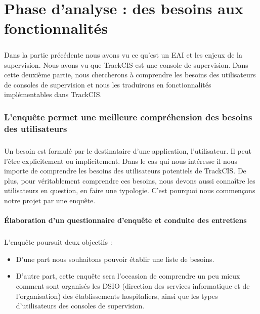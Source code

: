 \chapter{Phase d'analyse : des besoins aux fonctionnalités}
	\paragraph{}
	Dans la partie précédente nous avons vu ce qu'est un EAI et les enjeux de la
	supervision. Nous avons vu que TrackCIS est une console de supervision. Dans
	cette deuxième partie, nous chercherons à comprendre les besoins des
	utilisateurs de consoles de supervision et nous les traduirons en
	fonctionnalités implémentables dans TrackCIS.
	
	\subsection{L'enquête permet une meilleure compréhension des besoins des utilisateurs}
		\paragraph{}
		Un besoin est formulé par le destinataire d'une application, l'utilisateur. Il
		peut l'être explicitement ou implicitement. Dans le cas qui nous intéresse il
		nous importe de comprendre les besoins des utilisateurs potentiels de
		TrackCIS. De plus, pour véritablement comprendre ces besoins, nous devons
		aussi connaître les utilisateurs en question, en faire une typologie. C'est
		pourquoi nous commençons notre projet par une enquête.
		
		\subsubsection{Élaboration d'un questionnaire d'enquête et conduite des entretiens}
			\paragraph{}%
			L'enquête poursuit deux objectifs :
			\begin{itemize}
			  \item D’une part nous souhaitons pouvoir établir une liste de besoins.
			  \item D’autre part, cette enquête sera l’occasion de comprendre un peu
			  mieux comment sont organisés les DSIO (direction des services informatique
			  et de l’organisation) des établissements hospitaliers, ainsi que les types
			  d’utilisateurs des consoles de supervision.
			\end{itemize}
			
